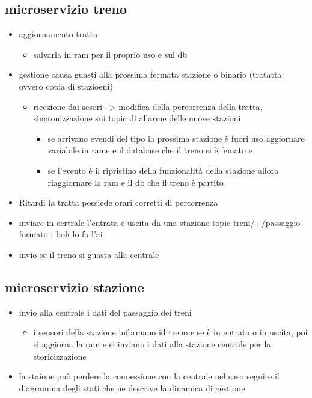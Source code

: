 \documentclass[11pt]{article}
\begin{document}
\subsection{microservizio treno}
\label{sec:orgb9f858f}
\begin{itemize}
\item aggiornamento tratta
\begin{itemize}
\item salvarla in ram per il proprio uso e sul db
\end{itemize}
\item gestione causa guasti alla prossima fermata stazione o binario (tratatta ovvero copia di stazioeni)
\begin{itemize}
\item ricezione dai sesori --> modifica della percorrenza della tratta, sincronizzazione sui topic di allarme delle
nuove stazioni
\begin{itemize}
\item se arrivano evendi del tipo la prossima stazione è fuori uso aggiornare variabile in rame e il database
che il treno si è femato e
\item se l'evento è il ripristino della funzionalità della stazione allora riaggiornare la ram e il db che il
treno è partito
\end{itemize}
\end{itemize}
\item Ritardi la tratta possiede orari corretti di percorrenza
\item inviare in certrale l'entrata e uscita da una stazione topic treni/+/passaggio
formato : boh lo fa l'ai
\item invio se il treno si guasta alla centrale
\end{itemize}
\subsection{microservizio stazione}
\label{sec:org08bfbdd}
\begin{itemize}
\item invio alla centrale i dati del passaggio dei treni
\begin{itemize}
\item i sensori della stazione informano id treno e se è in entrata o in uscita,
poi si aggiorna la ram e si inviano i dati alla stazione centrale per la storicizzazione
\end{itemize}
\item la staione può perdere la connessione
 con la centrale nel caso seguire il diagramma degli stati che ne
descrive la dinamica di gestione
\end{itemize}
\end{document}

